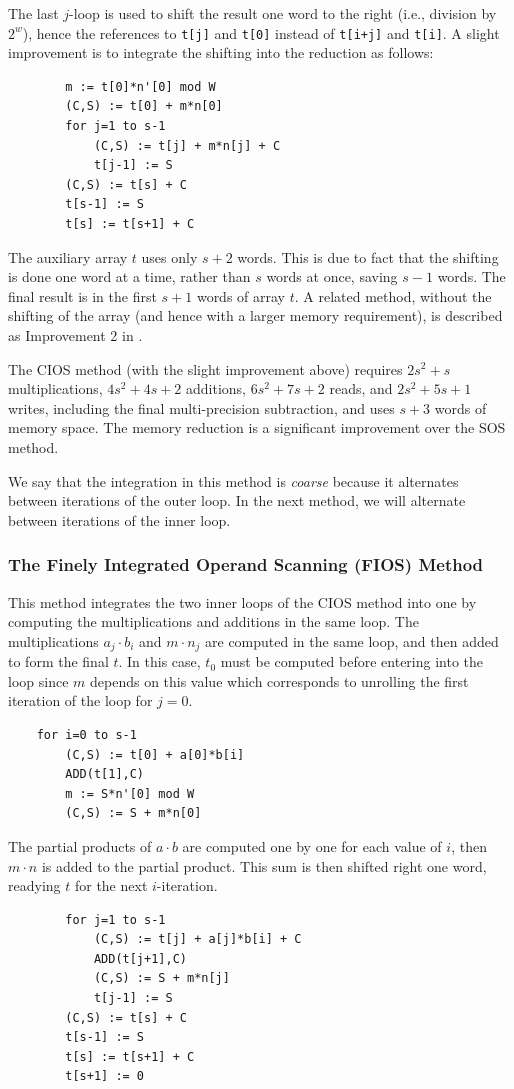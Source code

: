 \documentclass[twocolumn]{svjour3}          %
\begin{document}
\noindent
The last $j$-loop is used to shift the result one word to the right
(i.e., division by $2^w$), hence the references to \texttt{t[j]}
and \texttt{t[0]} instead of \texttt{t[i+j]} and \texttt{t[i]}.
A slight improvement is to integrate
the shifting into the reduction as follows:
%
\begin{verbatim}
        m := t[0]*n'[0] mod W
        (C,S) := t[0] + m*n[0]
        for j=1 to s-1
            (C,S) := t[j] + m*n[j] + C
            t[j-1] := S
        (C,S) := t[s] + C
        t[s-1] := S
        t[s] := t[s+1] + C
\end{verbatim}

\noindent
The auxiliary array $t$ uses only $s+2$
words.  This is due to fact that the shifting is done one word
at a time, rather than $s$ words at once, saving $s-1$ words.
The final result is in the first $s+1$ words of array $t$.
A related method, without the shifting of the array (and hence
with a larger memory requirement), is described
as Improvement 2 in \cite{DK90:A}.

The CIOS method (with the slight improvement above)
requires $2s^2+s$ multiplications, $4s^2+4s+2$ additions,
$6s^2+7s+2$ reads, and $2s^2+5s+1$ writes,
including the final multi-precision subtraction, and uses
$s+3$ words of memory space. The memory reduction is a significant
improvement over the SOS method.

We say that the integration in this method is \textit{coarse} because it
alternates between iterations of the outer loop. In the next method,
we will alternate between iterations of the inner loop.


\subsubsection{The Finely Integrated Operand Scanning (FIOS) Method}
\label{sect-fios}

This method integrates the two inner loops of the CIOS method
into one by computing
the multiplications and additions in the same loop.
The multiplications $a_j \cdot b_i$ and $m \cdot n_j$ are
computed in the same loop, and then added to form the final $t$.
In this case, $t_0$ must be computed before entering into the
loop since $m$ depends on this value which corresponds to unrolling
the first iteration of the loop for $j=0$.
%
\begin{verbatim}
    for i=0 to s-1
        (C,S) := t[0] + a[0]*b[i]
        ADD(t[1],C)
        m := S*n'[0] mod W
        (C,S) := S + m*n[0]
\end{verbatim}
%
The partial products of $a\cdot b$ are computed one by one for
each value of $i$, then $m\cdot n$ is added to the partial product.
This sum is then shifted right one word, readying $t$ for the
next $i$-iteration.
%
\begin{verbatim}
        for j=1 to s-1
            (C,S) := t[j] + a[j]*b[i] + C
            ADD(t[j+1],C)
            (C,S) := S + m*n[j]
            t[j-1] := S
        (C,S) := t[s] + C
        t[s-1] := S
        t[s] := t[s+1] + C
        t[s+1] := 0
\end{verbatim}
\end{document}
